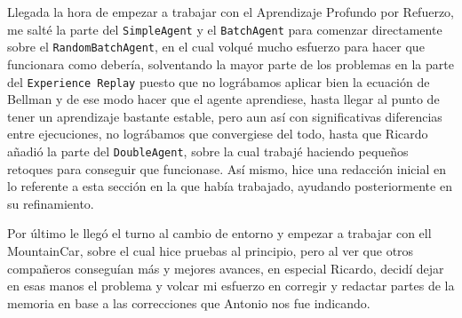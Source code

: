 Llegada la hora de empezar a trabajar con el Aprendizaje Profundo por Refuerzo, me salté la parte del \texttt{SimpleAgent} y el \texttt{BatchAgent} para comenzar directamente sobre el \texttt{RandomBatchAgent}, en el cual volqué mucho esfuerzo para hacer que funcionara como debería, solventando la mayor parte de los problemas en la parte del \texttt{Experience Replay} puesto que no lográbamos aplicar bien la ecuación de Bellman y de ese modo hacer que el agente aprendiese, hasta llegar al punto de tener un aprendizaje bastante estable, pero aun así con significativas diferencias entre ejecuciones, no lográbamos que convergiese del todo, hasta que Ricardo añadió la parte del \texttt{DoubleAgent}, sobre la cual trabajé haciendo pequeños retoques para conseguir que funcionase. Así mismo, hice una redacción inicial en lo referente a esta sección en la que había trabajado, ayudando posteriormente en su refinamiento.

Por último le llegó el turno al cambio de entorno y empezar a trabajar con ell MountainCar, sobre el cual hice pruebas al principio, pero al ver que otros compañeros conseguían más y mejores avances, en especial Ricardo, decidí dejar en esas manos el problema y volcar mi esfuerzo en corregir y redactar partes de la memoria en base a las correcciones que Antonio nos fue indicando.
